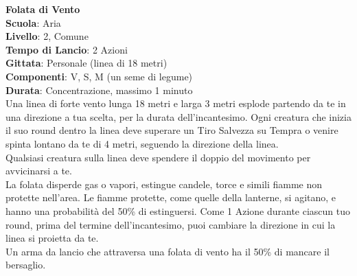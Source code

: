 \begin{multicols}{2}
\medskip\textbf{Folata di Vento}\\
\textbf{Scuola}: Aria\\
\textbf{Livello}: 2, Comune\\
\textbf{Tempo di Lancio}: 2 Azioni\\
\textbf{Gittata}: Personale (linea di 18 metri)\\
\textbf{Componenti}: V, S, M (un seme di legume)\\
\textbf{Durata}: Concentrazione, massimo 1 minuto\\
Una linea di forte vento lunga 18 metri e larga 3 metri esplode partendo da te in una direzione a tua scelta, per la durata dell'incantesimo. Ogni creatura che inizia il suo round dentro la linea deve superare un Tiro Salvezza su Tempra o venire spinta lontano da te di 4 metri, seguendo la direzione della linea.\\
Qualsiasi creatura sulla linea deve spendere il doppio del movimento per avvicinarsi a te.\\
La folata disperde gas o vapori, estingue candele, torce e simili fiamme non protette nell'area. Le fiamme protette, come quelle della lanterne, si agitano, e hanno una probabilità del 50\% di estinguersi. Come 1 Azione durante ciascun tuo round, prima del termine dell'incantesimo, puoi cambiare la direzione in cui la linea si proietta da te.\\
Un arma da lancio che attraversa una folata di vento ha il 50\% di mancare il bersaglio.


\end{multicols}
